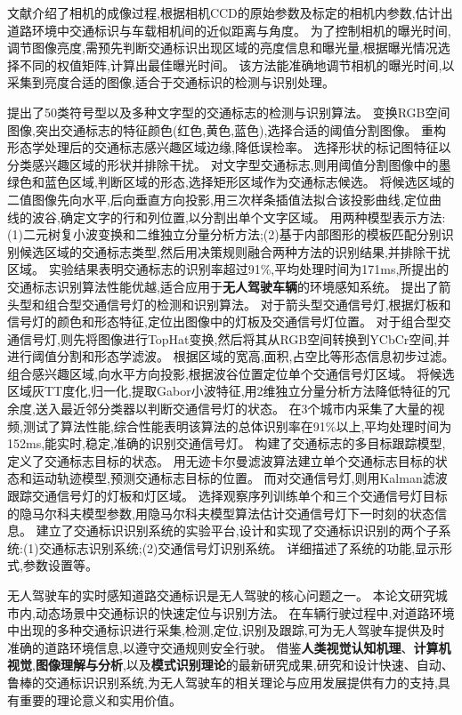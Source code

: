 \documentclass{amsart}
\begin{document}
文献\cite{谷明琴}介绍了相机的成像过程,根据相机CCD的原始参数及标定的相机内参数,估计出道路环境中交通标识与车载相机间的近似距离与角度。
为了控制相机的曝光时间,调节图像亮度,需预先判断交通标识出现区域的亮度信息和曝光量,根据曝光情况选择不同的权值矩阵,计算出最佳曝光时间。
该方法能准确地调节相机的曝光时间,以采集到亮度合适的图像,适合于交通标识的检测与识别处理。

提出了50类符号型以及多种文字型的交通标志的检测与识别算法。
变换RGB空间图像,突出交通标志的特征颜色(红色,黄色,蓝色),选择合适的阈值分割图像。
重构形态学处理后的交通标志感兴趣区域边缘,降低误检率。
选择形状的标记图特征以分类感兴趣区域的形状并排除干扰。
对文字型交通标志,则用阈值分割图像中的墨绿色和蓝色区域,判断区域的形态,选择矩形区域作为交通标志候选。
将候选区域的二值图像先向水平,后向垂直方向投影,用三次样条插值法拟合该投影曲线,定位曲
线的波谷,确定文字的行和列位置,以分割出单个文字区域。
用两种模型表示方法:(1)二元树复小波变换和二维独立分量分析方法;(2)基于内部图形的模板匹配分别识别候选区域的交通标志类型,然后用决策规则融合两种方法的识别结果,并排除干扰区域。
实验结果表明交通标志的识别率超过91\%,平均处理时间为171ms,所提出的交通标志识别算法性能优越,适合应用于\textbf{无人驾驶车辆}的环境感知系统。
提出了箭头型和组合型交通信号灯的检测和识别算法。
对于箭头型交通信号灯,根据灯板和信号灯的颜色和形态特征,定位出图像中的灯板及交通信号灯位置。
对于组合型交通信号灯,则先将图像进行TopHat变换,然后将其从RGB空间转换到YCbCr空间,并进行阈值分割和形态学滤波。
根据区域的宽高,面积,占空比等形态信息初步过滤。
组合感兴趣区域,向水平方向投影,根据波谷位置定位单个交通信号灯区域。
将候选区域灰TT度化,归一化,提取Gabor小波特征,用2维独立分量分析方法降低特征的冗余度,送入最近邻分类器以判断交通信号灯的状态。
在3个城市内采集了大量的视频,测试了算法性能,综合性能表明该算法的总体识别率在91\%以上,平均处理时间为152ms,能实时,稳定,准确的识别交通信号灯。
构建了交通标志的多目标跟踪模型,定义了交通标志目标的状态。
用无迹卡尔曼滤波算法建立单个交通标志目标的状态和运动轨迹模型,预测交通标志目标的位置。
而对交通信号灯,则用Kalman滤波跟踪交通信号灯的灯板和灯区域。
选择观察序列训练单个和三个交通信号灯目标的隐马尔科夫模型参数,用隐马尔科夫模型算法估计交通信号灯下一时刻的状态信息。
建立了交通标识识别系统的实验平台,设计和实现了交通标识识别的两个子系统:(1)交通标志识别系统;(2)交通信号灯识别系统。
详细描述了系统的功能,显示形式,参数设置等。


无人驾驶车的实时感知道路交通标识是无人驾驶的核心问题之一。
本论文研究城市内,动态场景中交通标识的快速定位与识别方法。
在车辆行驶过程中,对道路环境中出现的多种交通标识进行采集,检测,定位,识别及跟踪,可为无人驾驶车提供及时准确的道路环境信息,以遵守交通规则安全行驶。
借鉴\textbf{人类视觉认知机理}、\textbf{计算机视觉},\textbf{图像理解与分析},以及\textbf{模式识别理论}的最新研究成果,研究和设计快速、自动、鲁棒的交通标识识别系统,为无人驾驶车的相关理论与应用发展提供有力的支持,具有重要的理论意义和实用价值。
\end{document}
